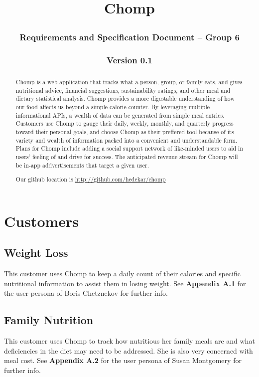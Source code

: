 \documentclass[a4paper,12pt]{article}
\begin{document}
\title{Chomp
\subsubsection*{Requirements and Specification Document -- Group 6}\subsubsection*{Version 0.1}
}\maketitle

\renewcommand{\abstractname}{Project Abstract}
\begin{abstract}

Chomp is a web application that tracks what a person, group, or family eats, and gives nutritional advice, financial suggestions, sustainability ratings, and other meal and dietary statistical analysis.  Chomp provides a more digestable understanding of how our food affects us beyond a simple calorie counter.  By leveraging multiple informational APIs, a wealth of data can be generated from simple meal entries.  Customers use Chomp to gauge their daily, weekly, monthly, and quarterly progress toward their personal goals, and choose Chomp as their preffered tool because of its variety and wealth of information packed into a convenient and understandable form.  Plans for Chomp include adding a social support network of like-minded users to aid in users' feeling of and drive for success.  The anticipated revenue stream for Chomp will be in-app addvertisements that target a given user.

Our github location is \url{http://github.com/hedekar/chomp}
\end{abstract}
\newpage
\tableofcontents
\newpage
\section{Customers}
\subsection{Weight Loss}
This customer uses Chomp to keep a daily count of their calories and specific nutritional information to assist them in losing weight.  See \textbf{Appendix A.1} for the user persona of Boris Chetznekov for further info.
\subsection{Family Nutrition}
This customer uses Chomp to track how nutritious her family meals are and what deficiencies in the diet may need to be addressed.  She is also very concerned with meal cost.  See \textbf{Appendix A.2} for the user persona of Susan Montgomery for further info.
\end{document}
